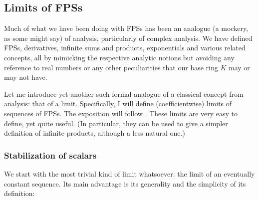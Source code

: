 \subsection{\label{sec.gf.lim}Limits of FPSs}

Much of what we have been doing with FPSs has been an analogue (a mockery, as
some might say) of analysis, particularly of complex analysis. We have defined
FPSs, derivatives, infinite sums and products, exponentials and various
related concepts, all by mimicking the respective analytic notions but
avoiding any reference to real numbers or any other peculiarities that our
base ring $K$ may or may not have.

Let me introduce yet another such formal analogue of a classical concept from
analysis: that of a limit. Specifically, I will define (coefficientwise)
limits of sequences of FPSs. The exposition will follow \cite[\S 7.5]%
{Loehr-BC}. These limits are very easy to define, yet quite useful. (In
particular, they can be used to give a simpler definition of infinite
products, although a less natural one.)

\subsubsection{Stabilization of scalars}

We start with the most trivial kind of limit whatsoever: the limit of an
eventually constant sequence. Its main advantage is its generality and the
simplicity of its definition:

